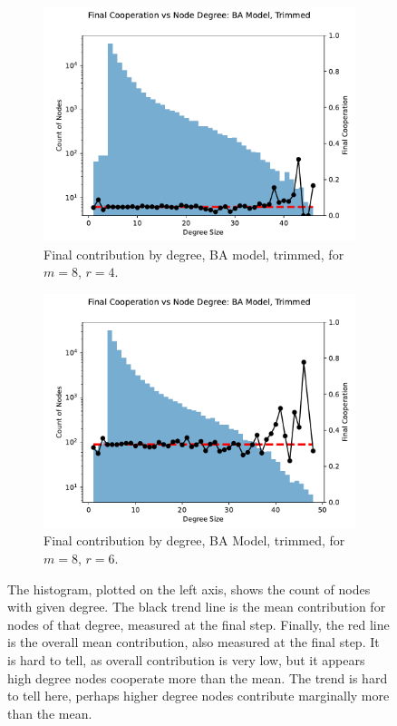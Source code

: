\FloatBarrier 
\begin{figure}[!h]
  \begin{subfigure}[b]{0.45\textwidth}
    \includegraphics[width=1.1\textwidth]{images/Rep_BA_node_groups_m_8_phi_4_trimmed.pdf}
    \caption{Final contribution by degree, BA model, trimmed, for $m=8$, $r=4$.   }
    \label{by_degree_m_8_phi_4}
  \end{subfigure}
  \hfill
  \begin{subfigure}[b]{0.45\textwidth}
    \includegraphics[width=1.1\textwidth]{images/Rep_BA_node_groups_m_8_phi_6_trimmed.pdf}
    \caption{Final contribution by degree, BA Model, trimmed, for $m=8$, $r=6$. }
    \label{by_degree_m_8_phi_6}
  \end{subfigure}
  \caption{The histogram, plotted on the left axis, shows the count of nodes with given degree. The black trend line is the mean contribution for nodes of that degree, measured at the final step. Finally, the red line is the overall mean contribution, also measured at the final step. It is hard to tell, as overall contribution is very low, but it appears high degree nodes cooperate more than the mean. The trend is hard to tell here, perhaps higher degree nodes contribute marginally more than the mean. } \label{by_degree_m_8}
\end{figure} 
\FloatBarrier


